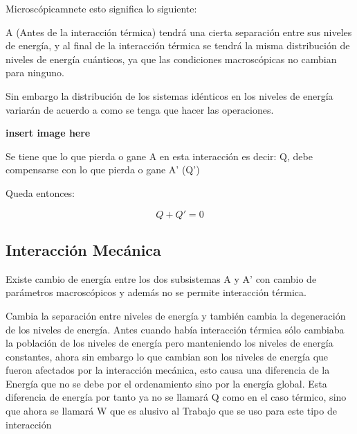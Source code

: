 \documentclass[11pt]{article}
\begin{document}
Microscópicamnete esto significa lo siguiente:

A (Antes de la interacción térmica) tendrá una cierta separación entre
sus niveles de energía, y al final de la interacción térmica se tendrá
la misma distribución de niveles de energía cuánticos, ya que las
condiciones macroscópicas no cambian para ninguno.

Sin embargo la distribución de los sistemas idénticos en los niveles
de energía variarán de acuerdo a como se tenga que hacer las
operaciones.


\textbf{insert image here}

Se tiene que lo que pierda o gane A en esta interacción es decir: Q, debe compensarse con lo que pierda o gane A' (Q')

Queda entonces:

$$ Q + Q' = 0 $$


\subsection{Interacción Mecánica}
\label{sec-1-8}

Existe cambio de energía entre los dos subsistemas A y A' con cambio
de parámetros macroscópicos y además no se permite interacción térmica.

Cambia la separación entre niveles de energía y también cambia la
degeneración de los niveles de energía. Antes cuando había interacción
térmica sólo cambiaba la población de los niveles de energía pero
manteniendo los niveles de energía constantes, ahora sin embargo lo
que cambian son los niveles de energía que fueron afectados por la
interacción mecánica, esto causa una diferencia de la Energía que no
se debe por el ordenamiento sino por la energía global. Esta
diferencia de energía por tanto ya no se llamará Q como en el caso
térmico, sino que ahora se llamará W que es alusivo al Trabajo que se
uso para este tipo de interacción
\end{document}
